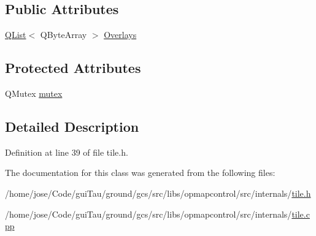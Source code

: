 \subsection*{Public Attributes}
\begin{DoxyCompactItemize}
\item 
\hyperlink{class_q_list}{Q\-List}$<$ Q\-Byte\-Array $>$ \hyperlink{group___o_p_map_widget_ga45369aa8480e3bd7ff5c6a6017573361}{Overlays}
\end{DoxyCompactItemize}
\subsection*{Protected Attributes}
\begin{DoxyCompactItemize}
\item 
Q\-Mutex \hyperlink{group___o_p_map_widget_gadfb1115a74bee691ed9d70c97b727ef7}{mutex}
\end{DoxyCompactItemize}


\subsection{Detailed Description}


Definition at line 39 of file tile.\-h.



The documentation for this class was generated from the following files\-:\begin{DoxyCompactItemize}
\item 
/home/jose/\-Code/gui\-Tau/ground/gcs/src/libs/opmapcontrol/src/internals/\hyperlink{tile_8h}{tile.\-h}\item 
/home/jose/\-Code/gui\-Tau/ground/gcs/src/libs/opmapcontrol/src/internals/\hyperlink{tile_8cpp}{tile.\-cpp}\end{DoxyCompactItemize}
